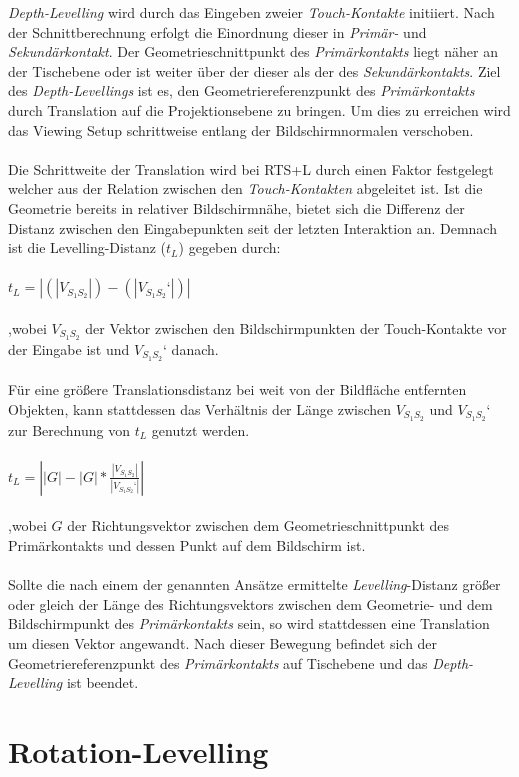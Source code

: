\emph{Depth-Levelling} wird durch das Eingeben zweier \emph{Touch-Kontakte} initiiert. Nach der Schnittberechnung erfolgt die Einordnung dieser in \emph{Primär-} und \emph{Sekundärkontakt}. Der Geometrieschnittpunkt des \emph{Primärkontakts} liegt näher an der Tischebene oder ist weiter über der dieser als der des \emph{Sekundärkontakts}. Ziel des \emph{Depth-Levellings} ist es, den Geometriereferenzpunkt des \emph{Primärkontakts} durch Translation auf die Projektionsebene zu bringen. Um dies zu erreichen wird das Viewing Setup schrittweise entlang der Bildschirmnormalen verschoben. 
\\\\
Die Schrittweite der Translation wird bei RTS+L durch einen Faktor festgelegt welcher aus der Relation zwischen den \emph{Touch-Kontakten} abgeleitet ist. Ist die Geometrie bereits in relativer Bildschirmnähe, bietet sich die Differenz der Distanz zwischen den Eingabepunkten  seit der letzten Interaktion an. Demnach ist die Levelling-Distanz ($t_L$) gegeben durch:
\\\\
$t_L = | (|V_{S_1S_2}|) - (|V_{S_1S_2}‘|) |$ 
\\\\
,wobei $V_{S_1S_2}$ der Vektor zwischen den Bildschirmpunkten der Touch-Kontakte vor der Eingabe ist und $V_{S_1S_2}‘$ danach. 
\\\\
Für eine größere Translationsdistanz bei weit von der Bildfläche entfernten Objekten, kann stattdessen das Verhältnis der Länge zwischen $V_{S_1S_2}$ und $V_{S_1S_2}‘$ zur Berechnung von $t_L$ genutzt werden.
\\\\
$t_L = \left||G| - |G| * \frac{|V_{S_1S_2}|}{|V_{S_1S_2}‘|}\right|$
\\\\
,wobei $G$ der Richtungsvektor zwischen dem Geometrieschnittpunkt des Primärkontakts und dessen Punkt auf dem Bildschirm ist.
\\\\
Sollte die nach einem der genannten Ansätze ermittelte \emph{Levelling}-Distanz größer oder gleich der Länge des Richtungsvektors zwischen dem Geometrie- und dem Bildschirmpunkt des \emph{Primärkontakts} sein, so wird stattdessen eine Translation um diesen Vektor angewandt. Nach dieser Bewegung befindet sich der Geometriereferenzpunkt des \emph{Primärkontakts} auf Tischebene und das \emph{Depth-Levelling} ist beendet.

\section{Rotation-Levelling}
\label{sec:rotation_levelling}

